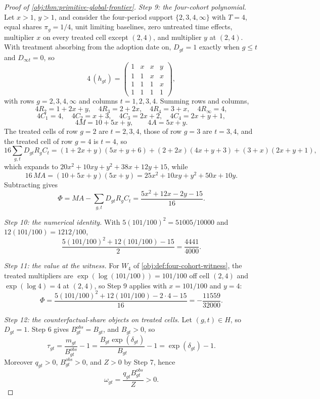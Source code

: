 \begin{proof}[Proof of \cref{obj:thm:primitive-global-frontier}]
\textit{Step 9: the four-cohort polynomial.} Let \(x>1\), \(y>1\), and consider the four-period support \(\{2,3,4,\infty\}\) with \(T=4\), equal shares \(\pi_g=1/4\), unit limiting baselines, zero untreated time effects, multiplier \(x\) on every treated cell except \((2,4)\), and multiplier \(y\) at \((2,4)\). With treatment absorbing from the adoption date on, \(D_{gt}=1\) exactly when \(g\le t\) and \(D_{\infty t}=0\), so
\[
4\,(h_{gt})=
\begin{pmatrix}
1&x&x&y\\
1&1&x&x\\
1&1&1&x\\
1&1&1&1
\end{pmatrix},
\]
with rows \(g=2,3,4,\infty\) and columns \(t=1,2,3,4\). Summing rows and columns,
\[
4R_2=1+2x+y,
\quad
4R_3=2+2x,
\quad
4R_4=3+x,
\quad
4R_\infty=4,
\]
\[
4C_1=4,
\quad
4C_2=x+3,
\quad
4C_3=2x+2,
\quad
4C_4=2x+y+1,
\]
\[
4M=10+5x+y,
\qquad
4A=5x+y .
\]
The treated cells of row \(g=2\) are \(t=2,3,4\), those of row \(g=3\) are \(t=3,4\), and the treated cell of row \(g=4\) is \(t=4\), so
\[
16\sum_{g,t}D_{gt}R_gC_t
=
(1+2x+y)(5x+y+6)+(2+2x)(4x+y+3)+(3+x)(2x+y+1),
\]
which expands to \(20x^2+10xy+y^2+38x+12y+15\), while
\[
16\,MA=(10+5x+y)(5x+y)=25x^2+10xy+y^2+50x+10y .
\]
Subtracting gives
\[
\Phi=MA-\sum_{g,t}D_{gt}R_gC_t=\frac{5x^2+12x-2y-15}{16}.
\]

\textit{Step 10: the numerical identity.} With \(5(101/100)^2=51005/10000\) and \(12(101/100)=1212/100\),
\[
\frac{5(101/100)^2+12(101/100)-15}{2}=\frac{4441}{4000}.
\]

\textit{Step 11: the value at the witness.} For \(W_4\) of \cref{obj:def:four-cohort-witness}, the treated multipliers are \(\exp(\log(101/100))=101/100\) off cell \((2,4)\) and \(\exp(\log4)=4\) at \((2,4)\), so Step 9 applies with \(x=101/100\) and \(y=4\):
\[
\Phi=\frac{5(101/100)^2+12(101/100)-2\cdot4-15}{16}=-\frac{11559}{32000}.
\]

\textit{Step 12: the counterfactual-share objects on treated cells.} Let \((g,t)\in H\), so \(D_{gt}=1\). Step 6 gives \(B^{obs}_{gt}=B_{gt}\), and \(B_{gt}>0\), so
\[
\tau_{gt}=\frac{m_{gt}}{B^{obs}_{gt}}-1
=\frac{B_{gt}\exp(\delta_{gt})}{B_{gt}}-1
=\exp(\delta_{gt})-1 .
\]
Moreover \(q_{gt}>0\), \(B^{obs}_{gt}>0\), and \(Z>0\) by Step 7, hence
\[
\omega_{gt}=\frac{q_{gt}B^{obs}_{gt}}{Z}>0 .
\]


\end{proof}
